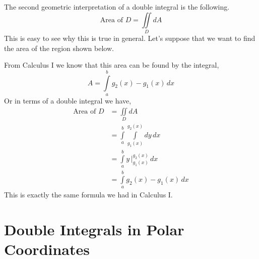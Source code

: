 \documentclass[10pt,reqno]{book}
\theoremstyle{definition}
\begin{document}
	The second geometric interpretation of a double integral is the following.
	\[ \text{Area of } D = \iint\limits_D dA \]
	This is easy to see why this is true in general.  Let’s suppose that we want to find the area of the region shown below.
	\begin{center}
	\end{center}
	From Calculus I we know that this area can be found by the integral,
	\[ A = \int\limits_a^b g_2(x) - g_1(x)\,dx \]
	Or in terms of a double integral we have,
	\begin{align*}
		\text{Area of } D &= \iint\limits_D dA\\
		&= \int\limits_a^b \int\limits_{g_1(x)}^{g_2(x)} dy\,dx\\
		&= \int\limits_a^b y \, \Big|_{g_1(x)}^{g_2(x)}\,dx\\
		&= \int\limits_a^b g_2(x) - g_1(x)\,dx
	\end{align*}
	This is exactly the same formula we had in Calculus I.
	
	\section{Double Integrals in Polar Coordinates}
	
\end{document}
